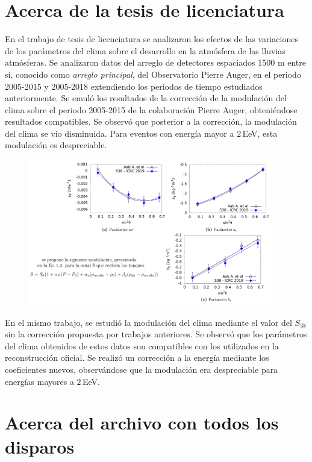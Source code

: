 \section{Acerca de la tesis de licenciatura}




En el trabajo de tesis de licenciatura se analizaron los efectos de las variaciones de los parámetros del clima sobre el desarrollo en la atmósfera de las lluvias atmósferas. Se analizaron datos del arreglo de detectores espaciados 1500 m entre sí, conocido como \emph{arreglo principal}, del Observatorio Pierre Auger, en el periodo 2005-2015 y 2005-2018 extendiendo los periodos de tiempo estudiados anteriormente. Se emuló los resultados de la corrección de la modulación del clima sobre el periodo 2005-2015 de la colaboración Pierre Auger, obteniéndose resultados compatibles. Se observó que posterior a la corrección, la modulación del clima se vio disminuida. Para eventos con energía mayor a $2\,$EeV, esta modulación es despreciable.
  \begin{figure}[H]
    \centering
    \includegraphics[width=0.95\textwidth]{../beamer-07-05-2020/tesis.png}
  \end{figure}
En el mismo trabajo, se estudió la modulación del clima mediante el valor del $S_{38}$ sin la corrección propuesta por trabajos anteriores. Se observó que los parámetros del clima obtenidos de estos datos son compatibles con los utilizados en la reconstrucción oficial. Se realizó un corrección a  la energía mediante los coeficientes nuevos, observándose que la modulación era despreciable para energías mayores a $2\,$EeV. 

\section{Acerca del archivo con todos los disparos}

